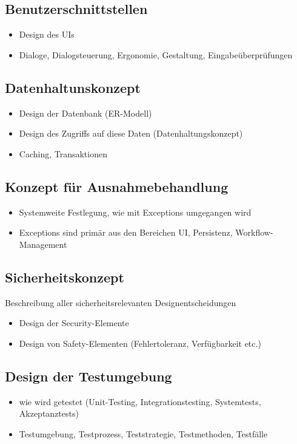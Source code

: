 \subsection{Benutzerschnittstellen} 
\begin{itemize}
	\item Design des UIs
	\item Dialoge, Dialogsteuerung, Ergonomie, Gestaltung, Eingabeüberprüfungen
\end{itemize}

\subsection{Datenhaltunskonzept}
\begin{itemize}
	\item Design der Datenbank (ER-Modell)
	\item Design des Zugriffs auf diese Daten (Datenhaltungskonzept)
	\item Caching, Transaktionen
\end{itemize}

\subsection{Konzept für Ausnahmebehandlung}
\begin{itemize}
	\item Systemweite Festlegung, wie mit Exceptions umgegangen wird
	\item Exceptions sind primär aus den Bereichen UI, Persistenz, Workflow-Management
\end{itemize}

\subsection{Sicherheitskonzept}
Beschreibung aller sicherheitsrelevanten Designentscheidungen

\begin{itemize}
	\item Design der Security-Elemente
	\item Design von Safety-Elementen (Fehlertoleranz, Verfügbarkeit etc.)
\end{itemize}

\subsection{Design der Testumgebung}
\begin{itemize}
	\item wie wird getestet (Unit-Testing, Integrationstesting, Systemtests, Akzeptanztests)
	\item Testumgebung, Testprozess, Teststrategie, Testmethoden, Testfälle
\end{itemize}


